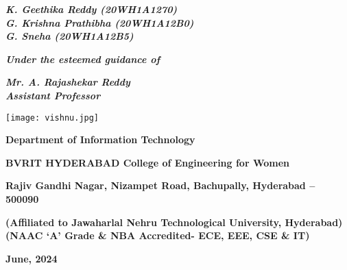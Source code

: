 \documentclass[12pt, English]{article}
\begin{document}
\begin{titlepage}
\begin{center}
\textit{\textbf{\large K. Geethika Reddy (20WH1A1270)}} \\
\textit{\textbf{\large G. Krishna Prathibha (20WH1A12B0)}} \\
\textit{\textbf{\large G. Sneha (20WH1A12B5)}} \\
\begin{large}
\textit{\textbf{Under the esteemed guidance of}}\\
\end{large}
\textbf{\large \textit {Mr. A. Rajashekar Reddy }}\\
\textbf{\large \textit {Assistant Professor}}
\begin{center}
\texttt{[image: vishnu.jpg]}
\end{center}
\begin{large}
\vspace*{-0.05in}
\textbf{Department of Information Technology}\\
\end{large}
\begin{Large}
\textbf{BVRIT HYDERABAD College of Engineering for Women}\\
\end{Large}
\begin{normalsize}
\textbf{ Rajiv Gandhi Nagar, Nizampet Road, Bachupally, Hyderabad – 500090}

\textbf{(Affiliated to Jawaharlal Nehru Technological University, Hyderabad)}\\

\textbf{(NAAC ‘A’ Grade \& NBA Accredited- ECE, EEE, CSE \& IT)}\\

\end{normalsize}
\begin{large}
\vspace{0.01in}
\textbf{ June, 2024}\\
\end{large}
\end{center}
\end{titlepage}
\end{document}
